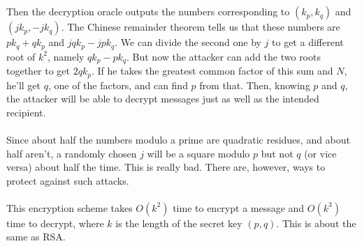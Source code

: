 \documentclass[10pt]{article}
\begin{document}
\\ ~ \\
Then the decryption oracle outputs the numbers corresponding to $ (k_p, k_q) $ and $ (jk_p, -jk_q) $.  The Chinese remainder theorem tells us that these numbers are $ pk_q + qk_p $ and $ jqk_p - jpk_q $.  We can divide the second one by $ j $ to get a different root of $ k^2 $, namely $ qk_p - pk_q $.  But now the attacker can add the two roots together to get $ 2qk_p $.  If he takes the greatest common factor of this sum and $ N $, he'll get $ q $, one of the factors, and can find $ p $ from that.  Then, knowing $ p $ and $ q $, the attacker will be able to decrypt messages just as well as the intended recipient.
\\ ~ \\
Since about half the numbers modulo a prime are quadratic residues, and about half aren't, a randomly chosen $ j $ will be a square modulo $ p $ but not $ q $ (or vice versa) about half the time.  This is really bad.  There are, however, ways to protect against such attacks.
\\ ~ \\
This encryption scheme takes $ O(k^2) $ time to encrypt a message and $ O(k^3) $ time to decrypt, where $ k $ is the length of the secret key $ (p, q) $.  This is about the same as RSA.
\end{document}
